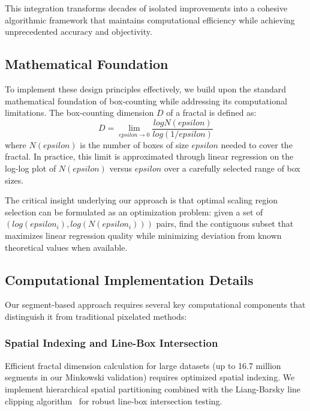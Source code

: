 \documentclass[preprint,12pt]{elsarticle}
\def\log{log}%
\def\epsilon{epsilon}%
\begin{document}
This integration transforms decades of isolated improvements into a cohesive algorithmic framework that maintains computational efficiency while achieving unprecedented accuracy and objectivity.

\subsection{Mathematical Foundation}

To implement these design principles effectively, we build upon the standard mathematical foundation of box-counting while addressing its computational limitations.
The box-counting dimension $D$ of a fractal is defined as:
\begin{equation}
D = \lim_{\epsilon \to 0} \frac{\log N(\epsilon)}{\log(1/\epsilon)}
\label{eq:box_counting_def}
\end{equation}
where $N(\epsilon)$ is the number of boxes of size $\epsilon$ needed to cover the fractal. In practice, this limit is approximated through linear regression on the log-log plot of $N(\epsilon)$ versus $\epsilon$ over a carefully selected range of box sizes.

The critical insight underlying our approach is that optimal scaling region selection can be formulated as an optimization problem: given a set of $(log(\epsilon_i), log(N(\epsilon_i)))$ pairs, find the contiguous subset that maximizes linear regression quality while minimizing deviation from known theoretical values when available.

\subsection{Computational Implementation Details}

Our segment-based approach requires several key computational components that distinguish it from traditional pixelated methods:

\subsubsection{Spatial Indexing and Line-Box Intersection}

Efficient fractal dimension calculation for large datasets (up to 16.7 million segments in our Minkowski validation) requires optimized spatial indexing. We implement hierarchical spatial partitioning combined with the Liang-Barsky line clipping algorithm~\cite{liang1984} for robust line-box intersection testing.
\end{document}
